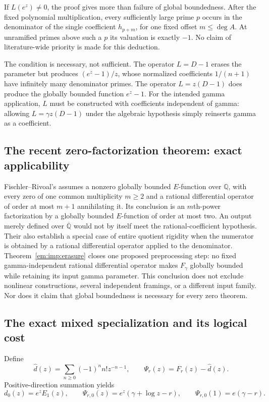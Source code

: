 \documentclass[11pt,a4paper]{article}
\theoremstyle{definition}
\theoremstyle{remark}
\theoremstyle{plain}
\numberwithin{equation}{section}
\begin{document}
If $L(e^z)\ne0$, the proof gives more than failure of global
boundedness. After the fixed polynomial multiplication, every
sufficiently large prime $p$ occurs in the denominator of the single
coefficient $h_{p+m}$, for one fixed offset $m\le\deg A$.
At unramified primes above such a $p$ its valuation is exactly $-1$.
No claim of literature-wide priority is made for this deduction.

The condition is necessary, not sufficient. The operator
$L=D-1$ erases the parameter but produces $(e^z-1)/z$, whose normalized
coefficients $1/(n+1)$ have infinitely many denominator primes.
The operator $L=z(D-1)$ does produce the globally bounded function
$e^z-1$. For the intended gamma application, $L$ must be constructed
with coefficients independent of gamma: allowing $L=\gamma z(D-1)$
under the algebraic hypothesis simply reinserts gamma as a coefficient.

\subsection{The recent zero-factorization theorem: exact applicability}

Fischler--Rivoal's \cite[Theorem~1.5]{FRzeros} assumes a nonzero globally
bounded $E$-function over $\mathbb Q$, with every zero of one common
multiplicity $m\ge2$ and a rational differential operator of order at
most $m+1$ annihilating it. Its conclusion is an $m$th-power
factorization by a globally bounded $E$-function of order at most two.
An output merely defined over $\overline{\mathbb Q}$ would not by
itself meet the rational-coefficient hypothesis. Their
\cite[Theorem~1.2 and Corollary~1.3]{FRzeros} also establish a special
case of entire quotient rigidity when the numerator is obtained by a
rational differential operator applied to the denominator.
Theorem~\ref{em:imp:erasure} closes one proposed preprocessing step:
no fixed gamma-independent rational differential operator makes
$F_\gamma$ globally bounded while retaining its input gamma parameter.
This conclusion does not exclude nonlinear constructions, several
independent framings, or a different input family. Nor does it claim
that global boundedness is necessary for every zero theorem.

\subsection{The exact mixed specialization and its logical cost}

Define
\[
 \widehat d(z)=\sum_{n\ge0}(-1)^nn!z^{-n-1},\qquad
 \Psi_r(z)=F_r(z)-\widehat d(z).
\]
Positive-direction summation yields
\[
 d_0(z)=e^zE_1(z),\qquad
 \Psi_{r,0}(z)=e^z(\gamma+\log z-r),\qquad
 \Psi_{r,0}(1)=e(\gamma-r).
\]
\end{document}

